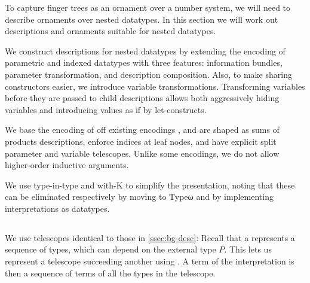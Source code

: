 To capture finger trees as an ornament over a number system, we will need to describe ornaments over nested datatypes. In this section we will work out descriptions and ornaments suitable for nested datatypes.

We construct descriptions for nested datatypes by extending the encoding of parametric and indexed datatypes with three features: information bundles, parameter transformation, and description composition. Also, to make sharing constructors easier, we introduce variable transformations. Transforming variables before they are passed to child descriptions allows both aggressively hiding variables and introducing values as if by let-constructs.

We base the encoding of off existing encodings \cite{sijsling,practgen}, and are shaped as sums of products descriptions, enforce indices at leaf nodes, and have explicit split parameter and variable telescopes. Unlike some encodings, we do not allow higher-order inductive arguments. 

We use type-in-type and with-K to simplify the presentation, noting that these can be eliminated respectively by moving to Typeω and by implementing interpretations as datatypes.

\subsection{}\label{ssec:desc}
We use telescopes identical to those in \autoref{ssec:bg-desc}:
Recall that a  represents a sequence of types, which can depend on the external type $P$. This lets us represent a telescope succeeding another using . A term of the interpretation  is then a sequence of terms of all the types in the telescope.

